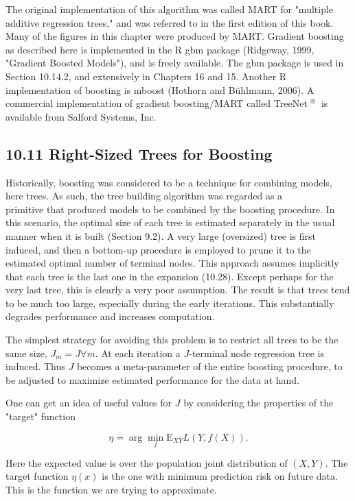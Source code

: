 \documentclass[10pt]{article}
\begin{document}
The original implementation of this algorithm was called MART for "multiple additive regression trees," and was referred to in the first edition of this book. Many of the figures in this chapter were produced by MART. Gradient boosting as described here is implemented in the R gbm package (Ridgeway, 1999, "Gradient Boosted Models"), and is freely available. The gbm package is used in Section 10.14.2, and extensively in Chapters 16 and 15. Another R implementation of boosting is mboost (Hothorn and Bühlmann, 2006). A commercial implementation of gradient boosting/MART called TreeNet ${ }^{\text {® }}$ is available from Salford Systems, Inc.

\subsection*{10.11 Right-Sized Trees for Boosting}
Historically, boosting was considered to be a technique for combining models, here trees. As such, the tree building algorithm was regarded as a\\
primitive that produced models to be combined by the boosting procedure. In this scenario, the optimal size of each tree is estimated separately in the usual manner when it is built (Section 9.2). A very large (oversized) tree is first induced, and then a bottom-up procedure is employed to prune it to the estimated optimal number of terminal nodes. This approach assumes implicitly that each tree is the last one in the expansion (10.28). Except perhaps for the very last tree, this is clearly a very poor assumption. The result is that trees tend to be much too large, especially during the early iterations. This substantially degrades performance and increases computation.

The simplest strategy for avoiding this problem is to restrict all trees to be the same size, $J_{m}=J \forall m$. At each iteration a $J$-terminal node regression tree is induced. Thus $J$ becomes a meta-parameter of the entire boosting procedure, to be adjusted to maximize estimated performance for the data at hand.

One can get an idea of useful values for $J$ by considering the properties of the "target" function


\begin{equation*}
\eta=\arg \min _{f} \mathrm{E}_{X Y} L(Y, f(X)) . \tag{10.39}
\end{equation*}


Here the expected value is over the population joint distribution of $(X, Y)$. The target function $\eta(x)$ is the one with minimum prediction risk on future data. This is the function we are trying to approximate.
\end{document}
